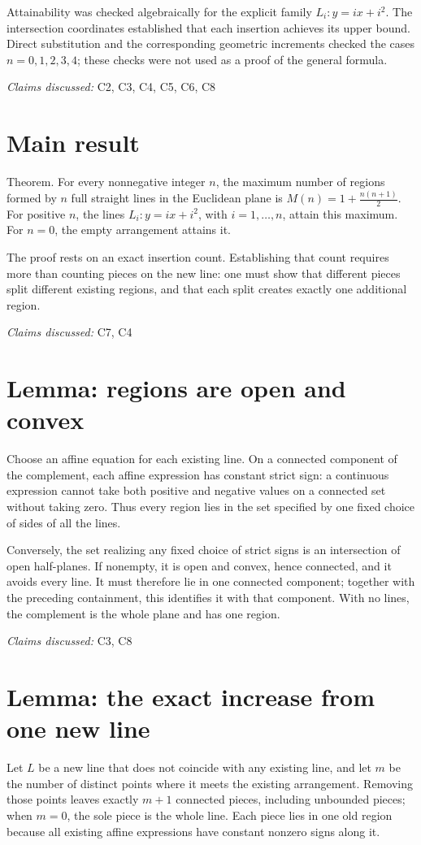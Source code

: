 \documentclass[11pt]{article}
\begin{document}
Attainability was checked algebraically for the explicit family $L_i: y=ix+i^2$. The intersection coordinates established that each insertion achieves its upper bound. Direct substitution and the corresponding geometric increments checked the cases $n=0,1,2,3,4$; these checks were not used as a proof of the general formula.

\textit{Claims discussed: }C2, C3, C4, C5, C6, C8
\section{Main result}
Theorem. For every nonnegative integer $n$, the maximum number of regions formed by $n$ full straight lines in the Euclidean plane is
$M(n)=1+\frac{n(n+1)}{2}$. For positive $n$, the lines $L_i: y=ix+i^2$, with $i=1,\ldots,n$, attain this maximum. For $n=0$, the empty arrangement attains it.

The proof rests on an exact insertion count. Establishing that count requires more than counting pieces on the new line: one must show that different pieces split different existing regions, and that each split creates exactly one additional region.

\textit{Claims discussed: }C7, C4
\section{Lemma: regions are open and convex}
Choose an affine equation for each existing line. On a connected component of the complement, each affine expression has constant strict sign: a continuous expression cannot take both positive and negative values on a connected set without taking zero. Thus every region lies in the set specified by one fixed choice of sides of all the lines.

Conversely, the set realizing any fixed choice of strict signs is an intersection of open half-planes. If nonempty, it is open and convex, hence connected, and it avoids every line. It must therefore lie in one connected component; together with the preceding containment, this identifies it with that component. With no lines, the complement is the whole plane and has one region.

\textit{Claims discussed: }C3, C8
\section{Lemma: the exact increase from one new line}
Let $L$ be a new line that does not coincide with any existing line, and let $m$ be the number of distinct points where it meets the existing arrangement. Removing those points leaves exactly $m+1$ connected pieces, including unbounded pieces; when $m=0$, the sole piece is the whole line. Each piece lies in one old region because all existing affine expressions have constant nonzero signs along it.
\end{document}
